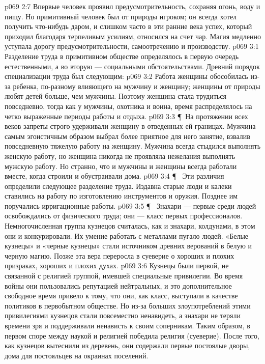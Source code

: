 \vs p069 2:7 Впервые человек проявил предусмотрительность, сохраняя огонь, воду и пищу. Но примитивный человек был от природы игроком; он всегда хотел получить что\hyp{}нибудь даром, и слишком часто в эти ранние века успех, который приходил благодаря терпеливым усилиям, относился на счет чар. Магия медленно уступала дорогу предусмотрительности, самоотречению и производству.
\vs p069 3:1 Разделение труда в примитивном обществе определялось в первую очередь естественными, а во вторую --- социальными обстоятельствами. Древний порядок специализации труда был следующим:
\vs p069 3:2 \bibnobreakspace {} Работа женщины обособилась из\hyp{}за ребенка, по\hyp{}разному влияющего на мужчину и женщину; женщины от природы любят детей больше, чем мужчины. Поэтому женщина стала трудиться повседневно, тогда как у мужчины, охотника и воина, время распределялось на четко выраженные периоды работы и отдыха.
\vs p069 3:3 \P\ На протяжении всех веков запреты строго удерживали женщину в отведенных ей границах. Мужчина самым эгоистичным образом выбрал более приятное для него занятие, взвалив повседневную тяжелую работу на женщину. Мужчина всегда стыдился выполнять женскую работу, но женщина никогда не проявляла нежелания выполнять мужскую работу. Но странно, что и мужчины и женщины всегда работали вместе, когда строили и обустраивали дома.
\vs p069 3:4 \P\ \bibnobreakspace {} Эти различия определили следующее разделение труда. Издавна старые люди и калеки ставились на работу по изготовлению инструментов и оружия. Позднее им поручались ирригационные работы.
\vs p069 3:5 \P\ \bibnobreakspace {} Знахари --- первые среди людей освобождались от физического труда; они --- класс первых профессионалов. Немногочисленная группа кузнецов считалась, как и знахари, колдунами, в этом они и конкурировали. Их умение работать с металлами пугало людей. «Белые кузнецы» и «черные кузнецы» стали источником древних верований в белую и черную магию. Позже эта вера переросла в суеверие о хороших и плохих призраках, хороших и плохих духах.
\vs p069 3:6 Кузнецы были первой, не связанной с религией группой, имевшей специальные привилегии. Во время войны они пользовались репутацией нейтральных, и это дополнительное свободное время привело к тому, что они, как класс, выступали в качестве политиков в первобытном обществе. Но из\hyp{}за больших злоупотреблений этими привилегиями кузнецов стали повсеместно ненавидеть, а знахари не теряли времени зря и поддерживали ненависть к своим соперникам. Таким образом, в первом споре между наукой и религией победила религия (суеверие). После того, как кузнецов вытеснили из деревень, они содержали первые постоялые дворы, дома для постояльцев на окраинах поселений.
